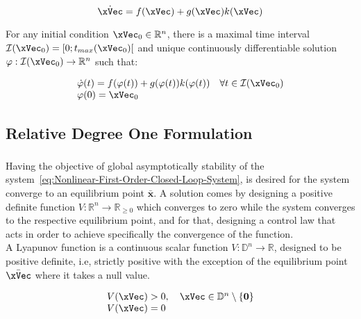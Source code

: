 \begin{equation}
    \dot{\xVec} = f(\xVec) + g(\xVec)k(\xVec)
    \label{eq:Nonlinear-First-Order-Closed-Loop-System} 
\end{equation}

For any initial condition \(\xVec_0 \in \mathbb{R}^n\), there is a maximal time interval \(\mathcal{I}(\xVec_0) = [0; t_{max}(\xVec_0)[ \) and unique continuously differentiable solution \(\varphi: \mathcal{I}(\xVec_0) \to \mathbb{R}^n \) such that:

\begin{equation}
    \begin{array}{l}
        \dot{\varphi}(t) = f(\varphi(t))+ g(\varphi(t))k(\varphi(t)) \quad \forall t \in \mathcal{I}(\xVec_0)  \\
        \varphi(0) = \xVec_0
    \end{array}
 \label{eq:Nonlinear-First-Order-Closed-Loop-System-UniqueSol}
\end{equation}


\subsection{Relative Degree One Formulation}
\label{sub:formulation}

\subsubsection{}
\label{subsub:control_lyapunov_function}

Having the objective of global asymptotically stability of the system~\ref{eq:Nonlinear-First-Order-Closed-Loop-System}, is desired for the system converge to an equilibrium point \( \bar{\mathbf{x}} \). A solution comes by designing a positive definite function \( V: \mathbb{R}^n \rightarrow \mathbb{R}_{\geq 0} \) which converges to zero while the system converges to the respective equilibrium point, and for that, designing a control law that acts in order to achieve specifically the convergence of the function. \\

A Lyapunov function is a continuous scalar function \(V:\mathbb{D}^n \to \mathbb{R}\), designed to be positive definite, i.e, strictly positive with the exception of the equilibrium point \(\bar{\xVec}\) where it takes a null value.  

\begin{equation}
    \begin{array}{l}
    V(\mathbf{\xVec}) > 0, \quad \xVec \in \mathbb{D}^n\setminus \{\mathbf{0}\} \\
    V(\mathbf{\xVec}) = 0
    \end{array}
    \label{eq:LF_condition}
\end{equation}

